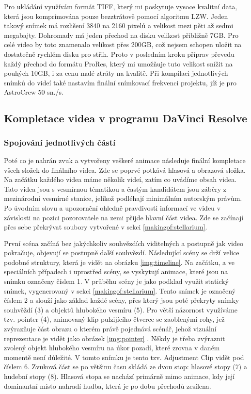 \documentclass[12pt,a4paper,titlepage]{article}
\begin{document}
Pro ukládání využívám formát TIFF, který mi poskytuje vysoce kvalitní data, která jsou komprimována pouze bezztrátově pomocí algoritmu LZW. Jeden takový snímek má rozlišení 3840 na 2160 pixelů a velikost mezi pěti až sedmi megabajty. Dohromady má jeden přechod na disku velikost přibližně 7GB. Pro celé video by toto znamenalo velikost přes 200GB, což nejsem schopen uložit na dostatečně rychlém disku pro střih. Proto v posledním kroku příprav převedu každý přechod do formátu ProRes, který mi umožňuje tuto velikost snížit na pouhých 10GB, i za cenu malé ztráty na kvalitě. Při kompilaci jednotlivých snímků do videí také nastavím finální snímkovací frekvenci projektu, jíž je pro AstroCrew 50 sn./s.
\subsection{Kompletace videa v programu DaVinci Resolve} \label{makingof:resolve}
\subsubsection{Spojování jednotlivých částí} \label{makingof:resolve:merging}
Poté co je nahrán zvuk a vytvořeny veškeré animace následuje finální kompletace všech složek do finálního videa. Zde se poprvé potkává hlasová a obrazová složka. Na začátku každého videa máme několik videí, zatím co uvádíme obsah videa. Tato videa jsou s vesmírnou tématikou a častým kandidátem jsou záběry z mezinárodní vesmírné stanice, jelikož podléhají minimálním autorským právům. Po úvodním slovu a upozornění ohledně pravdivosti informací ve videu v závislosti na pozici pozorovatele na zemi přijde hlavní část videa. Zde se začínají přes sebe překrývat soubory vytvořené v sekci \ref{makingof:stellarium}. 

První scéna začíná bez jakýchkoliv souhvězdích viditelných a postupně jak video pokračuje, objevují se postupně další souhvězdí. Následující scény se drží velice podobné struktury, která je vidět na obrázku \ref{img:timeline}. Na začátku, a ve speciálních případech i uprostřed scény, se vyskytují animace, které jsou na snímku označeny číslem 1. V průběhu scény je jako podklad využit statický snímek, vygenerovaný v sekci \ref{makingof:stellarium}. Tento snímek je označený číslem 2 a slouží jako základ každé scény, přes který jsou poté překryty snímky souhvěždí (3) a objektů hlubokého vesmíru (5). Pro větší názornost využíváme tzv. pointer (4), animovaný klip pulzijícího čtverce se zaoblenými rohy, jež zvýrazňuje část obrazu o kterém právě pojednává scénář, jehož vizuální reprezentace je vidět jako obrázek \ref{img:pointer} . Někdy je třeba zvýraznit zvolený objekt hlubokého vesmíru na úkor pozadí, které zrovna v daném momentě není důležité. V tomto snímku je tento tzv. Adjustment Clip vidět pod číslem 6. Zvuková část se po většinu času skládá ze dvou stop: hlasové stopy (7) a hudební stopy (8). Hlasová stopa se nachází primárně mimo animace, kdy její dominantní místo nahradí hudba, která je po dobu přechodů zesílena.
\end{document}
